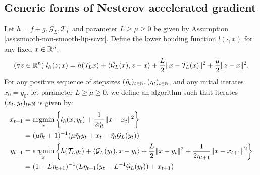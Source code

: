 \documentclass[12pt]{article}
\begin{document}
    \subsection{Generic forms of Nesterov accelerated gradient}
        \newcommand{\SCPPMAPG}{SC PPM APG}
        \begin{definition}[\SCPPMAPG]\label{def:SC-PPM-APG}
            
            Let $h = f + g, \mathcal G_L, \mathcal T_L$ and parameter $L \ge \mu \ge 0$ be given by
            \hyperref[ass:smooth-non-smooth-lip-scvx]
            {Assumption \ref*{ass:smooth-non-smooth-lip-scvx}}. 
            Define the lower bouding function $l(\cdot, x)$ for any fixed $x \in \mathbb R^n$: 
            \begin{align*}
                (\forall z \in \mathbb R^n) \; l_h(z; x) = h(\mathcal T_L x) + \langle \mathcal G_L (x), z - x\rangle
                + 
                \frac{L}{2}\Vert x - \mathcal T_L (x)\Vert^2 + \frac{\mu}{2}\Vert z - x\Vert^2. 
            \end{align*}
            For any positive sequence of stepsizes $(\tilde \eta_t)_{t \in \mathbb N}, (\eta_t)_{t \in \mathbb N}$, and any initial iterates $x_0 = y_0$, let parameter $L \ge \mu \ge 0$, we define an algorithm such that iterates $(x_t, y_t)_{t \in \mathbb N}$ is given by: 
            \begin{align*}
                x_{t + 1} &= \mathop{\rm argmin}\limits_{x} \left\lbrace
                l_h(x; y_t) + \frac{1}{2\tilde \eta_{t}} 
                \Vert x - x_t\Vert^2
                \right\rbrace
                \\
                &= (\mu\tilde \eta_{t} + 1)^{-1} 
                (\mu\tilde \eta_{t}y_t + x_t - \tilde \eta_{t}\mathcal G_L(y_t))
                \\
                y_{t + 1}&= 
                \mathop{\rm argmin}\limits_{x}
                \left\lbrace
                    h(\mathcal T_L y_t) + \langle \mathcal G_L(y_t), x - y_t\rangle + \frac{L}{2}\Vert x -y_t\Vert^2
                    + \frac{1}{2\eta_{t + 1}}\Vert x - x_{t + 1}\Vert^2
                \right\rbrace
                \\
                &= (1 + L \eta_{t +1})^{-1}(L\eta_{t + 1}(y_t - L^{-1}\mathcal G_L(y_t)) + x_{t + 1})
            \end{align*}
        \end{definition}
\end{document}
